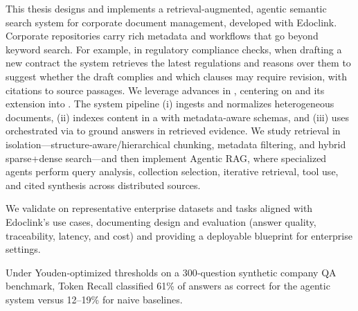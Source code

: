 \glsresetall
\noindent  
This thesis designs and implements a retrieval‑augmented, agentic semantic search system for corporate document management, developed with Edoclink. Corporate repositories carry rich metadata and workflows that go beyond keyword search. For example, in regulatory compliance checks, when drafting a new contract the system retrieves the latest regulations and reasons over them to suggest whether the draft complies and which clauses may require revision, with citations to source passages.
We leverage advances in , centering on  and its extension into . The system pipeline (i) ingests and normalizes heterogeneous documents, (ii) indexes content in a  with metadata‑aware schemas, and (iii) uses  orchestrated via  to ground answers in retrieved evidence. We study retrieval in isolation—structure‑aware/hierarchical chunking, metadata filtering, and hybrid sparse+dense search—and then implement Agentic RAG, where specialized agents perform query analysis, collection selection, iterative retrieval, tool use, and cited synthesis across distributed sources.

We validate on representative enterprise datasets and tasks aligned with Edoclink’s use cases, documenting design and evaluation (answer quality, traceability, latency, and cost) and providing a deployable blueprint for enterprise settings.

Under Youden‑optimized thresholds on a 300‑question synthetic company \gls{QA} benchmark, Token Recall classified 61\% of answers as correct for the agentic system versus 12–19\% for naive baselines.





